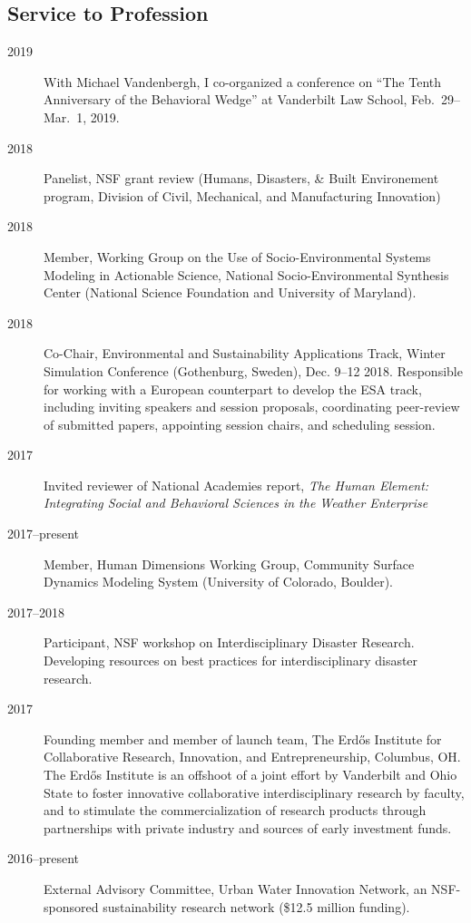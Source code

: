 \documentclass[10pt]{article}
\begin{document}
	\subsection{Service to Profession}
    	\begin{description}
            \item[2019] With Michael Vandenbergh, I co-organized a conference on ``The Tenth Anniversary of the Behavioral Wedge'' at Vanderbilt Law School, Feb.~29--Mar.~1, 2019.
            \item[2018] Panelist, NSF grant review (Humans, Disasters, \& Built Environement program, Division of Civil, Mechanical, and Manufacturing Innovation)
            \item[2018] Member, Working Group on the Use of Socio-Environmental Systems Modeling in Actionable Science, National Socio-Environmental Synthesis Center (National Science Foundation and University of Maryland).
            \item[2018] Co-Chair, Environmental and Sustainability Applications Track, Winter Simulation Conference (Gothenburg, Sweden), Dec. 9--12 2018. Responsible for working with a European counterpart to develop the ESA track, including inviting speakers and session proposals, coordinating peer-review of submitted papers, appointing session chairs, and scheduling session.
            \item[2017] Invited reviewer of National Academies report, \emph{The Human Element: Integrating Social and Behavioral Sciences in the Weather Enterprise}
            \item[2017--present] Member, Human Dimensions Working Group, Community Surface Dynamics Modeling System (University of Colorado, Boulder).
            \item[2017--2018] Participant, NSF workshop on Interdisciplinary Disaster Research. Developing resources on best practices for interdisciplinary disaster research.
            \item[2017] Founding member and member of launch team, The Erd\H{o}s Institute for Collaborative Research, Innovation, and Entrepreneurship, Columbus, OH. The Erd\H{o}s Institute is an offshoot of
            a joint effort by Vanderbilt and Ohio State to foster innovative collaborative interdisciplinary research by faculty, and to stimulate the commercialization of research products through partnerships
            with private industry and sources of early investment funds.
            \item[2016--present] External Advisory Committee, Urban Water Innovation Network, an NSF-sponsored sustainability research network (\$12.5 million funding).

\end{description}
\end{document}
